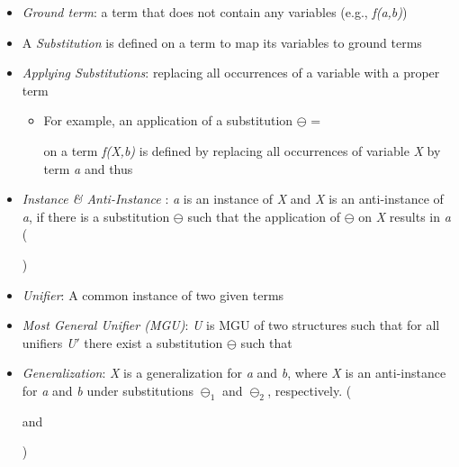 \documentclass{article}
\newcommand{\itt}{\textit}
\newcommand{\vars}{\textit}
\begin{document}
\begin{itemize} [leftmargin=.1in]
\item \itt{Ground term}: a term that does not contain any variables (e.g., \vars{f(a,b)})

\item A \itt{Substitution} is defined on a term to map its variables to ground terms
\item \itt{Applying Substitutions}: replacing all occurrences of a variable with a proper term
\begin{itemize}
\item For example, an application of a substitution $\ominus$ =
 on a term \vars{f(X,b)} is defined by replacing all occurrences of variable \vars{X} by term \vars{a} and thus
\end{itemize}

\item \itt{Instance \& Anti-Instance }:  \vars{a} is an instance of \vars{X} and \vars{X} is an anti-instance of \vars{a}, if there is a substitution $\ominus$ such that the application of $\ominus$ on \vars{X} results in \vars{a} ()

\item \itt{Unifier}: A common instance of two given terms
\item \itt{Most General Unifier (MGU)}: \vars{U} is MGU of two structures such that for all unifiers \vars{U}${\prime}$ there exist a substitution $\ominus$ such that 

\item \itt{Generalization}: \vars{X} is a generalization for \vars{a} and \vars{b}, where \vars{X} is an anti-instance for  \vars{a} and \vars{b} under substitutions $\ominus_1$ and $\ominus_2$, respectively. ( and)


\end{itemize}
\end{document}
